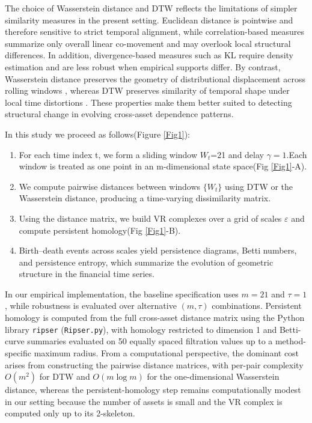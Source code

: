 \documentclass[11pt,reqno]{amsart}
\numberwithin{equation}{section} %
\begin{document}
The choice of Wasserstein distance and DTW reflects the limitations of simpler similarity measures in the present setting. 
Euclidean distance is pointwise and therefore sensitive to strict temporal alignment, while correlation-based measures summarize only overall linear co-movement and may overlook local structural differences. In addition, divergence-based measures such as KL require density estimation and are less robust when empirical supports differ. By contrast, Wasserstein distance preserves the geometry of distributional displacement across rolling windows \citep{RN3932}, whereas DTW preserves similarity of temporal shape under local time distortions \citep{RN3931}. These properties make them better suited to detecting structural change in evolving cross-asset dependence patterns.

In this study we proceed as follows(Figure \ref{Fig1}):
\begin{enumerate}
\item For each time index t, we form a sliding window $W_t$=21 and delay $\gamma=1$.Each window is treated as one point in an m-dimensional state space(Fig \ref{Fig1}-A).

\item We compute pairwise distances between windows $\{W_t\}$ using DTW or the Wasserstein distance, producing a time-varying dissimilarity matrix.

\item Using the distance matrix, we build VR complexes
over a grid of scales $\varepsilon$ and compute persistent homology(Fig \ref{Fig1}-B).
\item Birth–death events across scales yield persistence diagrams, Betti numbers, and persistence entropy, which summarize the evolution of geometric structure in the financial time series.
\end{enumerate}

In our empirical implementation, the baseline specification uses \(m=21\) and \(\tau=1\), while robustness is evaluated over alternative \((m,\tau)\) combinations. 
Persistent homology is computed from the full cross-asset distance matrix using the Python library \texttt{ripser} (\texttt{Ripser.py}\citep{RN2753}), with homology restricted to dimension 1 and Betti-curve summaries evaluated on 50 equally spaced filtration values up to a method-specific maximum radius. 
From a computational perspective, the dominant cost arises from constructing the pairwise distance matrices, with per-pair complexity \(O(m^2)\) for DTW and \(O(m \log m)\) for the one-dimensional Wasserstein distance, whereas the persistent-homology step remains computationally modest in our setting because the number of assets is small and the VR complex is computed only up to its 2-skeleton.
\end{document}
